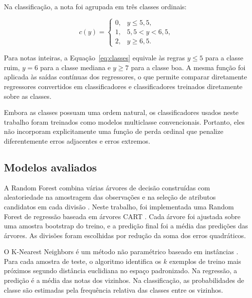 \documentclass[12pt,a4paper]{article}
\begin{document}
Na classifica\c{c}\~ao, a nota foi agrupada em tr\^es classes ordinais:

\begin{equation}
c(y) =
\begin{cases}
0, & y \leq 5{,}5,\\
1, & 5{,}5 < y < 6{,}5,\\
2, & y \geq 6{,}5.
\end{cases}
\label{eq:classes}
\end{equation}

Para notas inteiras, a Equa\c{c}\~ao~\ref{eq:classes} equivale \`as regras $y \leq 5$ para a classe ruim, $y=6$ para a classe mediana e $y \geq 7$ para a classe boa. A mesma fun\c{c}\~ao foi aplicada \`as sa\'idas cont\'inuas dos regressores, o que permite comparar diretamente regressores convertidos em classificadores e classificadores treinados diretamente sobre as classes.

Embora as classes possuam uma ordem natural, os classificadores usados neste trabalho foram treinados como modelos multiclasse convencionais. Portanto, eles n\~ao incorporam explicitamente uma fun\c{c}\~ao de perda ordinal que penalize diferentemente erros adjacentes e erros extremos.

\subsection{Modelos avaliados}
\label{subsec:modelos}

A Random Forest combina v\'arias \'arvores de decis\~ao constru\'idas com aleatoriedade na amostragem das observa\c{c}\~oes e na sele\c{c}\~ao de atributos candidatos em cada divis\~ao \cite{breiman2001random}. Neste trabalho, foi implementada uma Random Forest de regress\~ao baseada em \'arvores CART \cite{breiman1984cart}. Cada \'arvore foi ajustada sobre uma amostra bootstrap do treino, e a predi\c{c}\~ao final foi a m\'edia das predi\c{c}\~oes das \'arvores. As divis\~oes foram escolhidas por redu\c{c}\~ao da soma dos erros quadr\'aticos.

O K-Nearest Neighbors \'e um m\'etodo n\~ao param\'etrico baseado em inst\^ancias \cite{cover1967nearest}. Para cada amostra de teste, o algoritmo identifica os $k$ exemplos de treino mais pr\'oximos segundo dist\^ancia euclidiana no espa\c{c}o padronizado. Na regress\~ao, a predi\c{c}\~ao \'e a m\'edia das notas dos vizinhos. Na classifica\c{c}\~ao, as probabilidades de classe s\~ao estimadas pela frequ\^encia relativa das classes entre os vizinhos.
\end{document}
